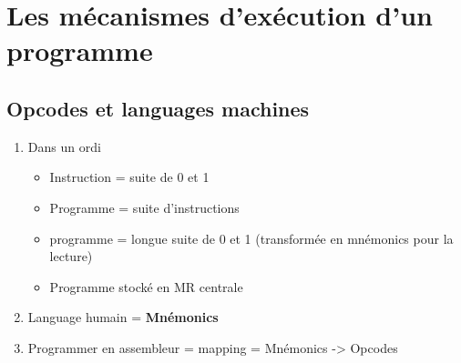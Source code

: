 \chapter{Les mécanismes d'exécution d'un programme}
\section{Opcodes et languages machines}
\begin{enumerate}
\item Dans un ordi
\begin{itemize}
  \item Instruction = suite de 0 et 1
  \item Programme = suite d'instructions
  \item programme = longue suite de 0 et 1 (transformée en mnémonics pour la lecture)
  \item Programme stocké en MR centrale
\end{itemize}
\item Language humain = \textbf{Mnémonics}
\item Programmer en assembleur = mapping = Mnémonics -> Opcodes 
\end{enumerate}

